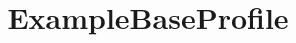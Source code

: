 \documentclass{test}
\begin{document}
\title{ExampleBaseProfile} \maketitle \noindent




\end{document}
